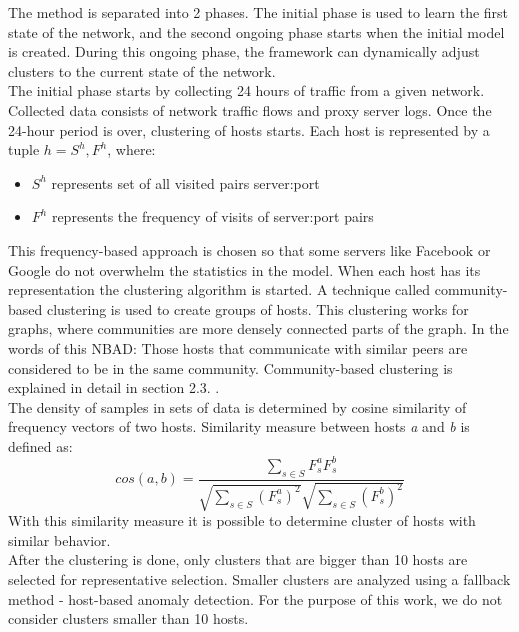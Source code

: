\documentclass[thesis=B,english]{FITthesis}[2012/10/20]
\begin{document}
The method is separated into 2 phases.                   
The initial phase is used to learn the first state of the network, and the second ongoing phase starts when the initial model is created.
During this ongoing phase, the framework can dynamically adjust clusters to the current state of the network. \\
                                                                                  
The initial phase starts by collecting 24 hours of traffic from a given network.        
Collected data consists of network traffic flows and proxy server logs.           
Once the 24-hour period is over, clustering of hosts starts.                      
Each host is represented by a tuple $h = {S^h, F^h}$, where:                      
\begin{itemize}                                                                   
    \item $S^h$ represents set of all visited pairs server:port                   
    \item $F^h$ represents the frequency of visits of server:port pairs           
\end{itemize}                                                                     
This frequency-based approach is chosen so that some servers like Facebook or Google do not overwhelm the statistics in the model.
When each host has its representation the clustering algorithm is started.
A technique called community-based clustering is used to create groups of hosts.
This clustering works for graphs, where communities are more densely connected parts of the graph.
In the words of this NBAD: Those hosts that communicate with similar peers are considered to be in the same community.
Community-based clustering is explained in detail in section 2.3. . \\

The density of samples in sets of data is determined by cosine similarity of frequency vectors of two hosts.
Similarity measure between hosts \textit{a} and \textit{b} is defined as:
$$cos(a, b) = \frac{\sum_{s \in S} F_s^a F_s^b} {\sqrt{\sum_{s \in S} (F_s^a)^2} \sqrt{\sum_{s \in S} (F_s^b)^2}}$$
With this similarity measure it is possible to determine cluster of hosts with similar behavior. \\

After the clustering is done, only clusters that are bigger than 10 hosts are selected for representative selection.
Smaller clusters are analyzed using a fallback method - host-based anomaly detection.
For the purpose of this work, we do not consider clusters smaller than 10 hosts. \\
\end{document}
